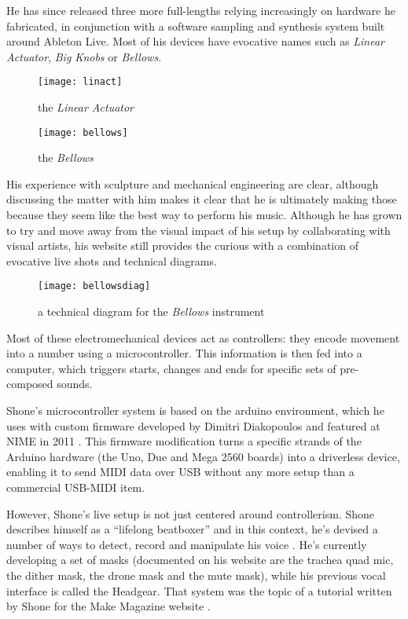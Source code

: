 He has since released three more full-lengths relying increasingly on hardware he fabricated, in conjunction with a software sampling and synthesis system built around Ableton Live. Most of his devices have evocative names such as \emph{Linear Actuator}, \emph{Big Knobs} or \emph{Bellows}. 

	\begin{figure}[h!]
	  \caption{the \emph{Linear Actuator}}
	  \centering
	    \texttt{[image: linact]}
	\end{figure}

	\begin{figure}[h!]
	  \caption{the \emph{Bellows}}
	  \centering
	    \texttt{[image: bellows]}
	\end{figure}

His experience with sculpture and mechanical engineering are clear, although discussing the matter with him makes it clear that he is ultimately making those because they seem like the best way to perform his music. Although he has grown to try and move away from the visual impact of his setup by collaborating with visual artists, his website still provides the curious with a combination of evocative live shots and technical diagrams. 

	\begin{figure}[h!]
	  \caption{a technical diagram for the \emph{Bellows} instrument}
	  \centering
	    \texttt{[image: bellowsdiag]}
	\end{figure}
	
Most of these electromechanical devices act as controllers: they encode movement into a number using a microcontroller. This information is then fed into a computer, which triggers starts, changes and ends for specific sets of pre-composed sounds. 

Shone's microcontroller system is based on the arduino environment, which he uses with custom firmware developed by Dimitri Diakopoulos and featured at NIME in 2011 \citep{diakopoulos2011,diakopoulos2015} . This firmware modification turns a specific strands of the Arduino hardware (the Uno, Due and Mega 2560 boards) into a driverless device, enabling it to send MIDI data over USB without any more setup than a commercial USB-MIDI item. 

However, Shone's live setup is not just centered around controllerism. Shone describes himself as a ``lifelong beatboxer'' and in this context, he's devised a number of ways to detect, record and manipulate his voice \citep{shone2012}. He's currently developing a set of masks (documented on his website are the trachea quad mic, the dither mask, the drone mask and the mute mask), while his previous vocal interface is called the Headgear. That system was the topic of a tutorial written by Shone for the Make Magazine website \citep{shone2012}. 

